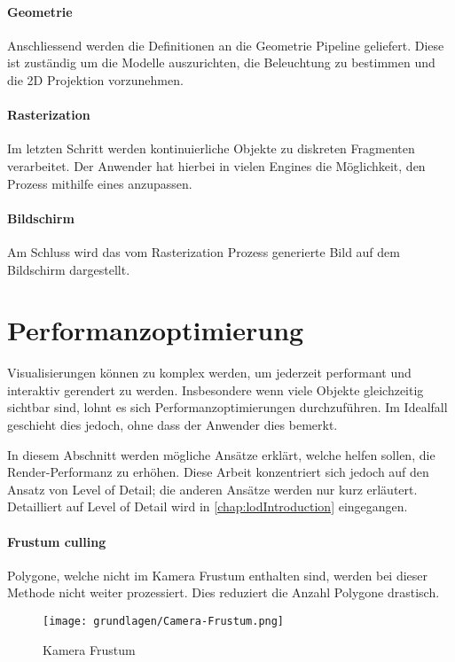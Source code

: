 \paragraph{Geometrie}
Anschliessend werden die Definitionen an die Geometrie Pipeline geliefert. Diese ist zuständig um die Modelle auszurichten, die Beleuchtung zu bestimmen und die 2D Projektion vorzunehmen.

\paragraph{Rasterization}
Im letzten Schritt werden kontinuierliche Objekte zu diskreten Fragmenten verarbeitet. Der Anwender hat hierbei in vielen Engines die Möglichkeit, den Prozess mithilfe eines  anzupassen.

\paragraph{Bildschirm}
Am Schluss wird das vom Rasterization Prozess generierte Bild auf dem Bildschirm dargestellt.

\section{Performanzoptimierung}
Visualisierungen können zu komplex werden, um jederzeit performant und interaktiv gerendert zu werden.
Insbesondere wenn viele Objekte gleichzeitig sichtbar sind, lohnt es sich Performanzoptimierungen durchzuführen.
Im Idealfall geschieht dies jedoch, ohne dass der Anwender dies bemerkt.

In diesem Abschnitt werden mögliche Ansätze erklärt, welche helfen sollen, die Render-Performanz zu erhöhen. Diese Arbeit konzentriert sich jedoch auf den Ansatz von Level of Detail; die anderen Ansätze werden nur kurz erläutert. Detailliert auf Level of Detail wird in \autoref{chap:lodIntroduction} eingegangen.

\paragraph{Frustum culling}
Polygone, welche nicht im Kamera Frustum enthalten sind, werden bei dieser Methode nicht weiter prozessiert.
Dies reduziert die Anzahl Polygone drastisch.

\begin{figure}[H]
  \centering
  \texttt{[image: grundlagen/Camera-Frustum.png]}
  \caption{Kamera Frustum}
  \label{fig:CameraFrustum}
\end{figure}

